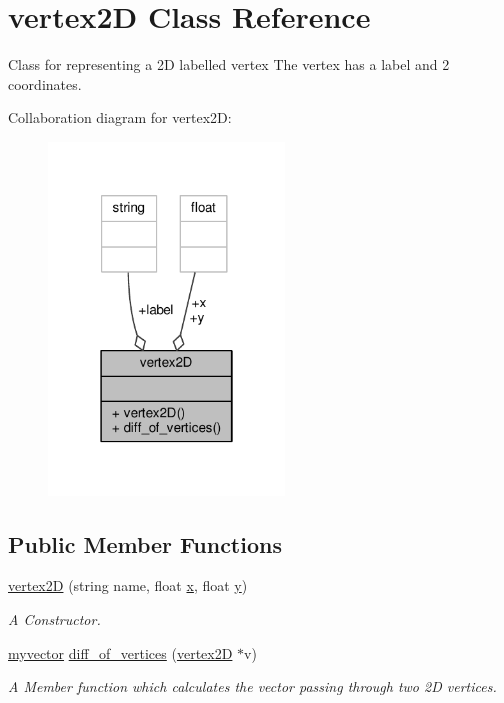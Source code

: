 \hypertarget{classvertex2D}{}\section{vertex2D Class Reference}
\label{classvertex2D}


Class for representing a 2D labelled vertex The vertex has a label and 2 coordinates.  




Collaboration diagram for vertex2D\+:\nopagebreak
\begin{figure}[H]
\begin{center}
\leavevmode
\includegraphics[width=178pt]{classvertex2D__coll__graph}
\end{center}
\end{figure}
\subsection*{Public Member Functions}
\begin{DoxyCompactItemize}
\item 
\hyperlink{classvertex2D_a9f266c8c501d0349e35018d2ea66c56a}{vertex2D} (string name, float \hyperlink{classvertex2D_a2ba74d18c3e8e5a36fd2846a7a4d1a4f}{x}, float \hyperlink{classvertex2D_a6ca32b6427f8d3ce3437db0bafd92a00}{y})
\begin{DoxyCompactList}\small\item\em A Constructor. \end{DoxyCompactList}\item 
\hyperlink{classmyvector}{myvector} \hyperlink{classvertex2D_abf7a4ac8c177a3cc1b068a2df276a4cf}{diff\+\_\+of\+\_\+vertices} (\hyperlink{classvertex2D}{vertex2D} $\ast$v)
\begin{DoxyCompactList}\small\item\em A Member function which calculates the vector passing through two 2D vertices. \end{DoxyCompactList}\end{DoxyCompactItemize}
